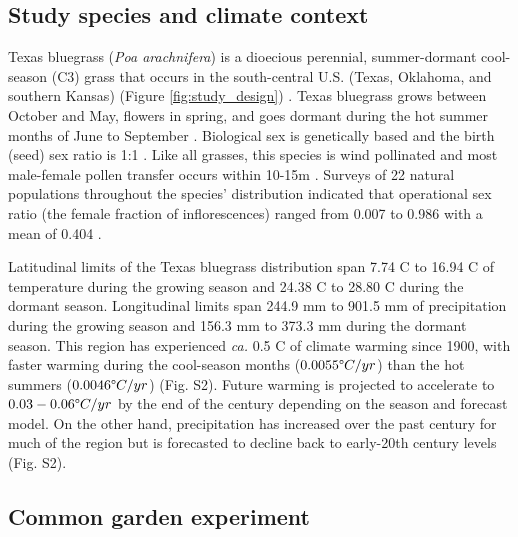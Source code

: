 \documentclass[9pt,twocolumn,twoside,lineno]{pnas-new}
\begin{document}
\subsection*{Study species and climate context}
Texas bluegrass (\textit{Poa arachnifera}) is a dioecious perennial, summer-dormant cool-season (C3) grass that occurs in the south-central U.S. (Texas, Oklahoma, and southern Kansas) (Figure \ref{fig:study_design}) \citep{hitchcock1971manual}. 
Texas bluegrass grows between October and May, flowers in spring, and goes dormant during the hot summer months of June to September \citep{kindiger2004interspecific}. 
Biological sex is genetically based and the birth (seed) sex ratio is 1:1 \citep{renganayaki2005identification}. 
Like all grasses, this species is wind pollinated \citep{hitchcock1971manual} and most male-female pollen transfer occurs within 10-15m \citep{compagnoni2017can}. 
Surveys of 22 natural populations throughout the species' distribution indicated that operational sex ratio (the female fraction of inflorescences) ranged from 0.007 to 0.986 with a mean of 0.404 \citep{miller2022two}. 

Latitudinal limits of the Texas bluegrass distribution span 7.74 \degree C to 16.94 \degree C of temperature during the growing season and 24.38 \degree C to 28.80 \degree C  during the dormant season. 
Longitudinal limits span 244.9 mm to 901.5 mm of precipitation during the growing season and 156.3 mm to 373.3 mm during the dormant season. 
This region has experienced \textit{ca.} 0.5 \degree C of climate warming since 1900, with faster warming during the cool-season months ($0.0055 \degree C / yr$) than the hot summers ($0.0046\degree C / yr$) (Fig. S2).
Future warming is projected to accelerate to $0.03-0.06\degree C / yr$ by the end of the century depending on the season and forecast model. 
On the other hand, precipitation has increased over the past century for much of the region but is forecasted to decline back to early-20th century levels (Fig. S2).

\subsection*{Common garden experiment}
\end{document}

